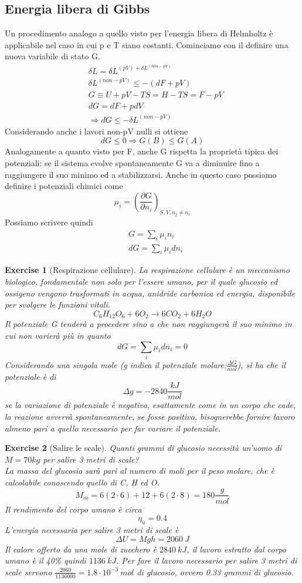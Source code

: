 \documentclass[10pt,a4paper]{article}
\newtheorem{exercise}{Exercise}
\begin{document}
\subsection{Energia libera di Gibbs}
Un procedimento analogo a quello visto per l'energia libera di Helmholtz è applicabile nel caso in cui p e T siano costanti. Cominciamo con il definire una nuova variabile di stato G. 
\begin{align*}
	&\delta L = \delta L^{(pV) + \delta L^{(non-pV)}}\\
	&\delta L^{(non-pV)} \leq -(dF + pV)\\
	&G \equiv U + pV -TS = H-TS  = F -pV\\
	&dG = dF + pdV\\
	&\Rightarrow dG \leq -\delta L^{(non-pV)}
\end{align*}
Considerando anche i lavori non-pV nulli si ottiene
\[dG\leq 0 \Rightarrow G(B)\leq G(A)\]
Analogamente a quanto visto per F, anche G rispetta la proprietà tipica dei potenziali: se il sistema evolve spontaneamente G va a diminuire fino a raggiungere il suo minimo ed a stabilizzarsi. Anche in questo caso possiamo definire i potenziali chimici come 
\[\mu_i = \left(\frac{\partial G}{\partial n_i}\right)_{S,V,n_j\neq n_i}\]
Possiamo scrivere quindi
\begin{align*}
	&G = \sum_i \mu_i n_i\\
	&dG = \sum_i \mu_i dn_i
\end{align*}
\begin{exercise}[Respirazione cellulare]
	La respirazione cellulare è un meccanismo biologico, fondamentale non solo per l'essere umano, per il quale glucosio ed ossigeno vengono trasformati in acqua, anidride carbonica ed energia, disponibile per svolgere le funzioni vitali.
	\[C_6H_{12}O_6 + 6O_2\rightarrow 6CO_2 + 6H_2O\]
	Il potenziale G tenderà a procedere sino a che non raggiungerà il suo minimo in cui non varierà più in quanto 
	\[dG = \sum_i \mu_i dn_i = 0\]
	Considerando una singola mole (g indica il potenziale molare:$\frac{ \Delta G}{mol}$), si ha che il potenziale è di 
	\[\Delta g = -2840 \frac{kJ}{mol}\]
	se la variazione di potenziale è negativa, esattamente come in un corpo che cade, la reazione avverrà spontaneamente, se fosse positivo, bisognerebbe fornire lavoro almeno pari a quello necessario per far variare il potenziale.  
\end{exercise}
\begin{exercise}[Salire le scale]
	Quanti grammi di glucosio necessità un'uomo di \(M = 70 kg\) per salire 3 metri di scale?\\
	La massa del glucosio sarà pari al numero di moli per il peso molare, che è calcolabile conoscendo quello di C, H ed O. 
	\[M_m = 6(2\cdot 6)+12+6(2\cdot 8) = 180\frac{g}{mol}\]
	Il rendimento del corpo umano è circa
	\[\eta_{u} = 0.4\]
	L'energia necessaria per salire 3 metri di scale è
	\[\Delta U = M g h = 2060\ J\]
	Il calore offerto da una mole di zucchero è \(2840\ kJ\), il lavoro estratto dal corpo umano è il 40\% quindi \(1136\ kJ\). Per fare il lavoro necessario per salire 3 metri di scale servono \(\frac{2060}{1136000}= 1.8\cdot 10^{-3}\ mol\) di glucosio, ovvero 0.33 grammi di glucosio. 
\end{exercise}
\end{document}
